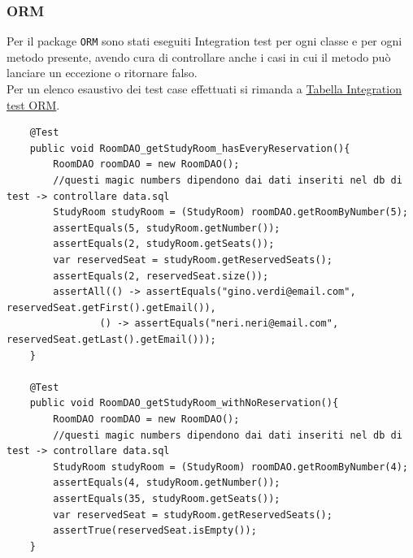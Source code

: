 \subsubsection{ORM}
Per il package \texttt{ORM} sono stati eseguiti Integration test per ogni classe e per ogni metodo presente, avendo cura di controllare anche i casi in cui il metodo può lanciare un eccezione o ritornare falso.\\
Per un elenco esaustivo dei test case effettuati si rimanda a \hyperref[ORM_IT]{Tabella Integration test ORM}.
\begin{code}
    \begin{verbatim}
    @Test
    public void RoomDAO_getStudyRoom_hasEveryReservation(){
        RoomDAO roomDAO = new RoomDAO();
        //questi magic numbers dipendono dai dati inseriti nel db di test -> controllare data.sql
        StudyRoom studyRoom = (StudyRoom) roomDAO.getRoomByNumber(5);
        assertEquals(5, studyRoom.getNumber());
        assertEquals(2, studyRoom.getSeats());
        var reservedSeat = studyRoom.getReservedSeats();
        assertEquals(2, reservedSeat.size());
        assertAll(() -> assertEquals("gino.verdi@email.com", reservedSeat.getFirst().getEmail()),
                () -> assertEquals("neri.neri@email.com", reservedSeat.getLast().getEmail()));
    }
    
    @Test
    public void RoomDAO_getStudyRoom_withNoReservation(){
        RoomDAO roomDAO = new RoomDAO();
        //questi magic numbers dipendono dai dati inseriti nel db di test -> controllare data.sql
        StudyRoom studyRoom = (StudyRoom) roomDAO.getRoomByNumber(4);
        assertEquals(4, studyRoom.getNumber());
        assertEquals(35, studyRoom.getSeats());
        var reservedSeat = studyRoom.getReservedSeats();
        assertTrue(reservedSeat.isEmpty());
    }

    \end{verbatim}
    \caption{Test case da RoomDAOIntegrationTest}
\end{code}
